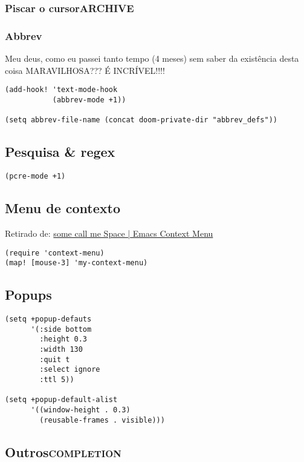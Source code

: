 \documentclass[11pt]{article}
\begin{document}
\subsubsection{Piscar o cursor\hfill{}\textsc{ARCHIVE}}
\label{sec:org371e6dc}
\subsubsection{Abbrev}
\label{sec:orgb99a92e}
Meu deus, como eu passei tanto tempo (4 meses) sem saber da existência
desta coisa MARAVILHOSA??? É INCRÍVEL!!!!

\begin{verbatim}
(add-hook! 'text-mode-hook
           (abbrev-mode +1))

(setq abbrev-file-name (concat doom-private-dir "abbrev_defs"))
\end{verbatim}

\subsection{Pesquisa \& regex}
\label{sec:orgb6e2528}
\begin{verbatim}
(pcre-mode +1)
\end{verbatim}

\subsection{Menu de contexto}
\label{sec:org8172c01}

Retirado de:
\href{https://somecallmespace.com/emacs-context-menu.html}{some call me Space | Emacs Context Menu}

\begin{verbatim}
(require 'context-menu)
(map! [mouse-3] 'my-context-menu)
\end{verbatim}

\subsection{Popups}
\label{sec:org9f4e53b}
\begin{verbatim}
(setq +popup-defauts
      '(:side bottom
        :height 0.3
        :width 130
        :quit t
        :select ignore
        :ttl 5))

(setq +popup-default-alist
      '((window-height . 0.3)
        (reusable-frames . visible)))

\end{verbatim}

\subsection{Outros\hfill{}\textsc{completion}}
\label{sec:org07835dd}
\end{document}
